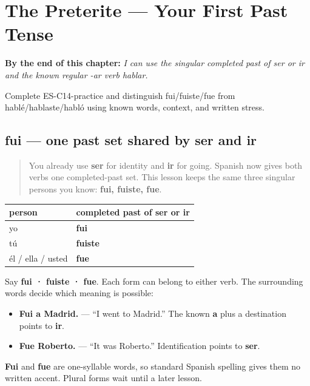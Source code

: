 
\chapter{The Preterite --- Your First Past Tense}
\label{ch:preterite}

\begin{chapteropening}
\textbf{By the end of this chapter:} \emph{I can use the singular completed past of ser or ir and the known regular -ar verb hablar.}

Complete ES-C14-practice and distinguish fui/fuiste/fue from hablé/hablaste/habló using known words, context, and written stress.
\end{chapteropening}

\section[fui]{fui — one past set shared by ser and ir}

\label{lesson:ES-C14-ser-ir-preterite}



\begin{quote}
You already use \textbf{ser} for identity and \textbf{ir} for going. Spanish now gives both verbs one completed-past set. This lesson keeps the same three singular persons you know: \textbf{fui, fuiste, fue}.
\end{quote}

\begin{grammarlens}[title={Grammar Lens: three singular forms, two verbs}]
\noindent
\begin{tabularx}{\linewidth}{@{}>{\raggedright\arraybackslash}X>{\raggedright\arraybackslash}X@{}}
\toprule
\textbf{person} & \textbf{completed past of \textbf{ser} or \textbf{ir}} \\
\midrule
yo & \textbf{fui} \\
tú & \textbf{fuiste} \\
él / ella / usted & \textbf{fue} \\
\bottomrule
\end{tabularx}

Say \textbf{fui · fuiste · fue}. Each form can belong to either verb. The surrounding words decide which meaning is possible:

\begin{itemize}
\raggedright
  \item \textbf{Fui a Madrid.} — “I went to Madrid.” The known \textbf{a} plus a destination points to \textbf{ir}.
  \item \textbf{Fue Roberto.} — “It was Roberto.” Identification points to \textbf{ser}.
\end{itemize}

\textbf{Fui} and \textbf{fue} are one-syllable words, so standard Spanish spelling gives them no written accent. Plural forms wait until a later lesson.
\end{grammarlens}

